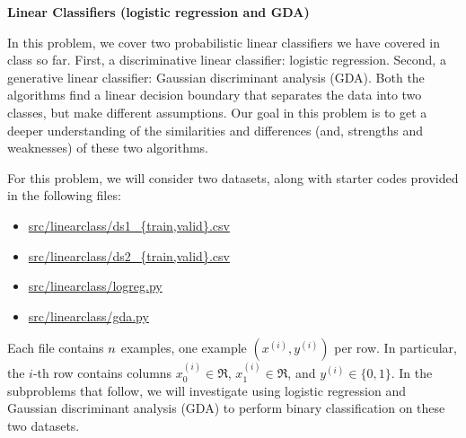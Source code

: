 \item {} {\bf Linear Classifiers (logistic regression and GDA)}

In this problem, we cover two probabilistic linear classifiers we have
covered in class so far. First, a discriminative linear classifier: logistic
regression. Second, a generative linear classifier: Gaussian discriminant
analysis (GDA). Both the algorithms find a linear decision boundary that
separates the data into two classes, but make different assumptions. Our goal
in this problem is to get a deeper understanding of the similarities and
differences (and, strengths and weaknesses) of these two algorithms.

For this problem, we will consider two datasets, along with starter codes provided in the following
files:
\begin{center}
\begin{itemize} %
	\item \url{src/linearclass/ds1_{train,valid}.csv}
	\item \url{src/linearclass/ds2_{train,valid}.csv}
        \item \url{src/linearclass/logreg.py}
        \item \url{src/linearclass/gda.py}
\end{itemize}
\end{center}
Each file contains ${n}$ examples, one example $(x^{(i)}, y^{(i)})$ per row.
In particular, the $i$-th row contains columns $x^{(i)}_0\in\Re$,
$x^{(i)}_1\in\Re$, and $y^{(i)}\in\{0, 1\}$. In the subproblems that follow, we
will investigate using logistic regression and Gaussian discriminant analysis
(GDA) to perform binary classification on these two datasets.

\begin{enumerate}
	
        \ifnum{} {
            
        } \fi

	
        \ifnum{} {
            
        } \fi


	
        \ifnum{} {
            
        }\fi

	
        \ifnum{} {
            
        } \fi

	
        \ifnum{} {
            
        } \fi

	
        \ifnum{} {
            
        } \fi

	
        \ifnum{}\fi

	
        \ifnum{}\fi

\end{enumerate}
